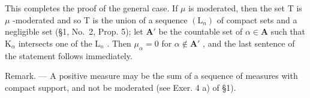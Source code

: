 This completes the proof of the general case. If \(\mu\) is moderated, then the set T is \(\mu\) -moderated and so T is the union of a sequence \((\mathrm{L}_n)\) of compact sets and a negligible set (§1, No.~2, Prop. 5); let \(\mathbf{A}'\) be the countable set of \(\alpha \in \mathbf{A}\) such that \(\mathrm{K}_{\alpha}\) intersects one of the \(\mathrm{L}_n\) . Then \(\mu_{\alpha} = 0\) for \(\alpha \notin \mathbf{A}'\) , and the last sentence of the statement follows immediately.

Remark. --- A positive measure may be the sum of a sequence of measures with compact support, and not be moderated (see Exer. 4 a) of §1).

